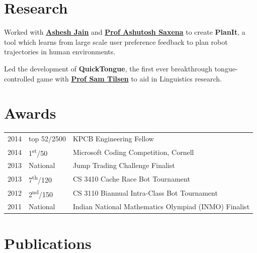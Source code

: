 \documentclass[]{deedy-resume-openfont}
\begin{document}
\begin{minipage}[t]{0.66\textwidth}

\section{Research}
Worked with \textbf{\href{http://www.cs.cornell.edu/~ashesh/}{Ashesh Jain}} and \textbf{\href{http://www.cs.cornell.edu/~asaxena/}{Prof Ashutosh Saxena}} to create \textbf{PlanIt}, a tool which  learns from large scale user preference feedback to plan robot trajectories in human environments.  
\sectionsep

Led the development of \textbf{QuickTongue}, the first ever breakthrough tongue-controlled game with \textbf{\href{http://conf.ling.cornell.edu/~tilsen/}{Prof Sam Tilsen}} to aid in Linguistics research. 
\sectionsep


\section{Awards} 
\begin{tabular}{rll}
2014	     & top 52/2500  & KPCB Engineering Fellow\\
2014	     & 1\textsuperscript{st}/50  & Microsoft Coding Competition, Cornell\\
2013	     & National  & Jump Trading Challenge Finalist\\
2013     & 7\textsuperscript{th}/120 & CS 3410 Cache Race Bot Tournament  \\
2012     & 2\textsuperscript{nd}/150 & CS 3110 Biannual Intra-Class Bot Tournament \\
2011     & National & Indian National Mathematics Olympiad (INMO) Finalist \\
\end{tabular}
\sectionsep


\section{Publications} 
\renewcommand\refname{\vskip -1.5cm} %


\nocite{*}

\end{minipage} 
\end{document}
